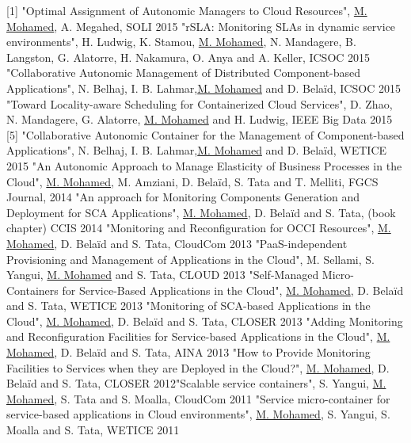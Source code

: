 \documentclass[11pt,a4paper,sans]{moderncv}   %
\begin{document}
[1] "Optimal Assignment of Autonomic Managers to Cloud Resources", \underline{M. Mohamed}, A. Megahed, SOLI 2015 \newline
[2] "rSLA: Monitoring SLAs in dynamic service environments", H. Ludwig, K. Stamou, \underline{M. Mohamed}, N. Mandagere, B. Langston, 
G. Alatorre, H. Nakamura, O. Anya and A. Keller, ICSOC 2015 \newline
[3] "Collaborative Autonomic Management of Distributed Component-based Applications", N. Belhaj, I. B. Lahmar,\underline{M. Mohamed} and D. Bela\"id,  ICSOC 2015 \newline
[4] "Toward Locality-aware Scheduling for Containerized Cloud Services", D. Zhao, N. Mandagere, G. Alatorre, \underline{M. Mohamed} and H. Ludwig, IEEE Big Data 2015
[5] "Collaborative Autonomic Container for the Management of Component-based Applications", N. Belhaj, I. B. Lahmar,\underline{M. Mohamed} and D. Bela\"id,  WETICE 2015 \newline
[6] "An Autonomic Approach to Manage Elasticity of Business Processes in the Cloud", \underline{M. Mohamed}, M. Amziani, D. Bela\"id, S. Tata and T. Melliti, FGCS Journal, 
2014 \newline
[7] "An approach for Monitoring Components Generation and Deployment for SCA Applications", \underline{M. Mohamed}, D. Bela\"id and S. Tata, (book chapter) CCIS 2014 \newline
[8] "Monitoring and Reconfiguration for OCCI Resources", \underline{M. Mohamed}, D. Bela\"id and S. Tata, CloudCom 2013 \newline
[9] "PaaS-independent Provisioning and Management of Applications in the Cloud", M. Sellami, S. Yangui, \underline{M. Mohamed} and S. Tata, CLOUD 2013 \newline
[10] "Self-Managed Micro-Containers for Service-Based Applications in the Cloud", \underline{M. Mohamed}, D. Bela\"id and S. Tata, WETICE 2013 \newline
[11] "Monitoring of SCA-based Applications in the Cloud", \underline{M. Mohamed}, D. Bela\"id and S. Tata, CLOSER 2013 \newline
[12] "Adding Monitoring and Reconfiguration Facilities for Service-based Applications in the Cloud", \underline{M. Mohamed}, D. Bela\"id and S. Tata, AINA 2013 \newline
[13] "How to Provide Monitoring Facilities to Services when they are Deployed in the Cloud?", \underline{M. Mohamed}, D. Bela\"id and S. Tata, CLOSER 2012\newline
[14] "Scalable service containers", S. Yangui, \underline{M. Mohamed}, S. Tata and S. Moalla,  CloudCom 2011 \newline
[15] "Service micro-container for service-based applications in Cloud environments", \underline{M. Mohamed}, S. Yangui, S. Moalla and S. Tata,  WETICE 2011\newline
\end{document}
